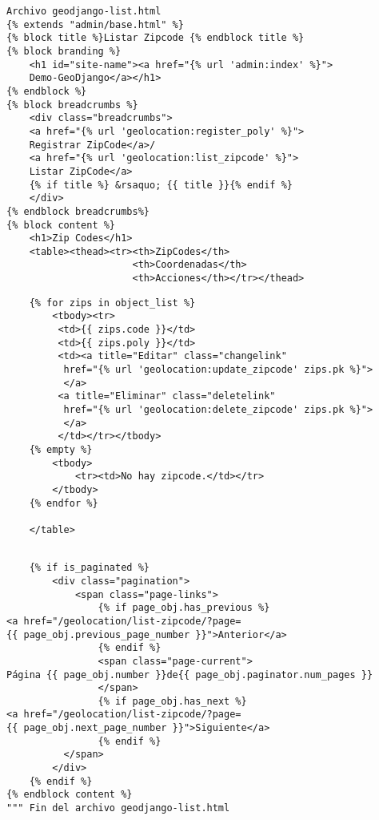 \documentclass[xcolor=dvipsnames]{beamer}
\begin{document}
\begin{frame}[fragile]
\begin{verbatim}
Archivo geodjango-list.html
{% extends "admin/base.html" %}
{% block title %}Listar Zipcode {% endblock title %}
{% block branding %}
    <h1 id="site-name"><a href="{% url 'admin:index' %}">
    Demo-GeoDjango</a></h1>
{% endblock %}
{% block breadcrumbs %}
    <div class="breadcrumbs">
    <a href="{% url 'geolocation:register_poly' %}">
    Registrar ZipCode</a>/
    <a href="{% url 'geolocation:list_zipcode' %}">
    Listar ZipCode</a>
    {% if title %} &rsaquo; {{ title }}{% endif %}
    </div>
{% endblock breadcrumbs%}
{% block content %}
    <h1>Zip Codes</h1>
    <table><thead><tr><th>ZipCodes</th>
                      <th>Coordenadas</th>
                      <th>Acciones</th></tr></thead>
\end{verbatim}
\end{frame}

\begin{frame}[fragile]
\begin{verbatim}
    {% for zips in object_list %}
        <tbody><tr>
         <td>{{ zips.code }}</td>
         <td>{{ zips.poly }}</td>
         <td><a title="Editar" class="changelink" 
          href="{% url 'geolocation:update_zipcode' zips.pk %}">
          </a>
         <a title="Eliminar" class="deletelink" 
          href="{% url 'geolocation:delete_zipcode' zips.pk %}">
          </a>
         </td></tr></tbody>
    {% empty %}
        <tbody>
            <tr><td>No hay zipcode.</td></tr>
        </tbody>
    {% endfor %}
 
    </table>
\end{verbatim}
\end{frame}

\begin{frame}[fragile]
\begin{verbatim}

    {% if is_paginated %}
        <div class="pagination">
            <span class="page-links">
                {% if page_obj.has_previous %}
<a href="/geolocation/list-zipcode/?page=
{{ page_obj.previous_page_number }}">Anterior</a>
                {% endif %}
                <span class="page-current">
Página {{ page_obj.number }}de{{ page_obj.paginator.num_pages }}
                </span>
                {% if page_obj.has_next %}
<a href="/geolocation/list-zipcode/?page=
{{ page_obj.next_page_number }}">Siguiente</a>
                {% endif %}
          </span>
        </div>
    {% endif %}
{% endblock content %}
""" Fin del archivo geodjango-list.html
\end{verbatim}
\end{frame}
\end{document}
